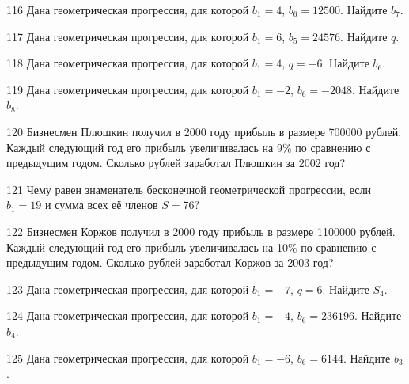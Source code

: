 \documentclass[4apaper]{article}
\begin{document}
\begin{taskBN}{116}
Дана геометрическая прогрессия, для которой $b_1 = 4$, $b_{6}=12500$. Найдите $b_{7}$.
\end{taskBN}

\begin{taskBN}{117}
Дана геометрическая прогрессия, для которой $b_1 = 6$, $b_{5}=24576$. Найдите $q$.
\end{taskBN}

\begin{taskBN}{118}
Дана геометрическая прогрессия, для которой $b_1 = 4$, $q=-6$. Найдите $b_{6}$.
\end{taskBN}

\begin{taskBN}{119}
Дана геометрическая прогрессия, для которой $b_1 = -2$, $b_{6}=-2048$. Найдите $b_{8}$.
\end{taskBN}

\begin{taskBN}{120}
Бизнесмен Плюшкин получил в 2000 году прибыль в размере 700000 рублей. Каждый следующий год его прибыль увеличивалась на 9\% по сравнению с предыдущим годом. Сколько рублей заработал Плюшкин за 2002 год?
\end{taskBN}

\begin{taskBN}{121}
Чему равен знаменатель бесконечной геометрической прогрессии, если $b_1 = 19$ и сумма всех её членов $S=76$?
\end{taskBN}

\begin{taskBN}{122}
Бизнесмен Коржов получил в 2000 году прибыль в размере 1100000 рублей. Каждый следующий год его прибыль увеличивалась на 10\% по сравнению с предыдущим годом. Сколько рублей заработал Коржов за 2003 год?
\end{taskBN}

\begin{taskBN}{123}
Дана геометрическая прогрессия, для которой $b_1 = -7$, $q=6$. Найдите $S_{4}$.
\end{taskBN}

\begin{taskBN}{124}
Дана геометрическая прогрессия, для которой $b_1 = -4$, $b_{6}=236196$. Найдите $b_{4}$.
\end{taskBN}

\begin{taskBN}{125}
Дана геометрическая прогрессия, для которой $b_{1} = -6$, $b_{6}=6144$. Найдите $b_{3}$.
\end{taskBN}
\end{document}

